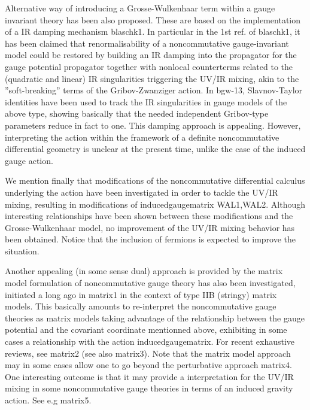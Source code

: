 \documentclass[10pt]{book}
\theoremstyle{break}
\begin{document}
Alternative way of introducing a Grosse-Wulkenhaar term within a gauge invariant theory has been also proposed. These are based on the implementation of a IR damping mechanism {blaschk1}. In particular in the 1st ref. of {blaschk1}, it has been claimed that renormalisability of a noncommutative gauge-invariant model could be restored by building an IR damping into the propagator for the gauge potential propagator together with nonlocal counterterms related to the (quadratic and linear) IR singularities triggering the UV/IR mixing, akin to the ''soft-breaking'' terms of the Gribov-Zwanziger action. In {bgw-13}, Slavnov-Taylor identities have been used to track the IR singularities in gauge models of the above type, showing basically that the needed independent Gribov-type parameters reduce in fact to one. This damping approach is appealing. However, interpreting the action within the framework of a definite noncommutative differential geometry is unclear at the present time, unlike the case of 
the induced gauge action.\par 

We mention finally that modifications of the noncommutative differential calculus underlying the action  have been investigated in order to tackle the UV/IR mixing, resulting in modifications of inducedgaugematrix WAL1,WAL2. Although interesting relationships have been shown between these modifications and the Grosse-Wulkenhaar model, no improvement of the UV/IR mixing behavior has been obtained. Notice that the inclusion of fermions is expected to improve the situation. 

Another appealing (in some sense dual) approach is provided by the matrix model formulation of noncommutative gauge theory has also been investigated, initiated a long ago in {matrix1} in the context of type IIB (stringy) matrix models. This basically amounts to re-interpret the noncommutative gauge theories as matrix models taking advantage of the relationship between the gauge potential and the covariant coordinate mentionned above, exhibiting in some cases a relationship with the action {inducedgaugematrix}. For recent exhaustive reviews, see {matrix2} (see also {matrix3}). Note that the matrix model approach may in some cases allow one to go beyond the perturbative approach {matrix4}. One interesting outcome is that it may provide a interpretation for the UV/IR mixing in some noncommutative gauge theories in terms of an induced gravity action. See e.g {matrix5}. \par
\end{document}
